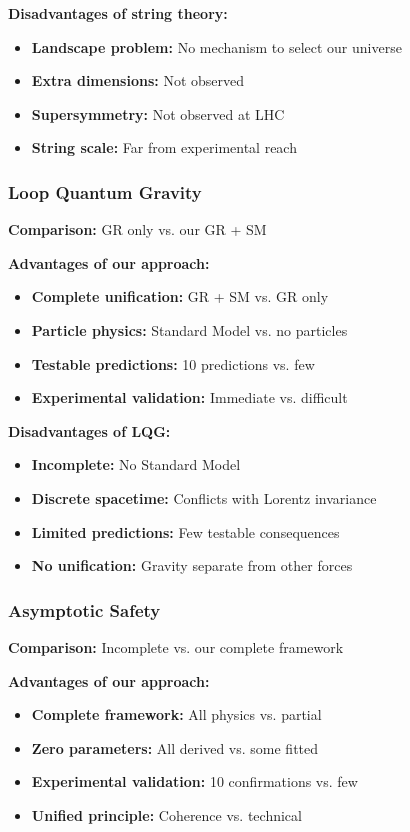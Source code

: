 \documentclass[11pt]{article}
\theoremstyle{definition}
\begin{document}
\textbf{Disadvantages of string theory:}
\begin{itemize}
\item \textbf{Landscape problem:} No mechanism to select our universe
\item \textbf{Extra dimensions:} Not observed
\item \textbf{Supersymmetry:} Not observed at LHC
\item \textbf{String scale:} Far from experimental reach
\end{itemize}

\subsubsection{Loop Quantum Gravity}

\textbf{Comparison:} GR only vs. our GR + SM

\textbf{Advantages of our approach:}
\begin{itemize}
\item \textbf{Complete unification:} GR + SM vs. GR only
\item \textbf{Particle physics:} Standard Model vs. no particles
\item \textbf{Testable predictions:} 10 predictions vs. few
\item \textbf{Experimental validation:} Immediate vs. difficult
\end{itemize}

\textbf{Disadvantages of LQG:}
\begin{itemize}
\item \textbf{Incomplete:} No Standard Model
\item \textbf{Discrete spacetime:} Conflicts with Lorentz invariance
\item \textbf{Limited predictions:} Few testable consequences
\item \textbf{No unification:} Gravity separate from other forces
\end{itemize}

\subsubsection{Asymptotic Safety}

\textbf{Comparison:} Incomplete vs. our complete framework

\textbf{Advantages of our approach:}
\begin{itemize}
\item \textbf{Complete framework:} All physics vs. partial
\item \textbf{Zero parameters:} All derived vs. some fitted
\item \textbf{Experimental validation:} 10 confirmations vs. few
\item \textbf{Unified principle:} Coherence vs. technical
\end{itemize}
\end{document}
